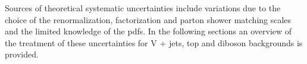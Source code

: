 Sources of theoretical systematic uncertainties include variations due to the
choice of the renormalization, factorization and parton shower matching scales
and the limited knowledge of the \glspl{pdf}. In the following sections an
overview of the treatment of these uncertainties for V + jets, top and diboson
backgrounds is provided.
